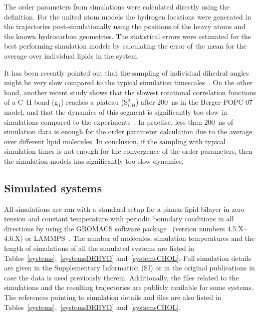 \documentclass[pre,aps,floatfix,authordate1-4,twocolumn]{revtex4-1}
\begin{document}
The order parameters from simulations were calculated directly using the definition.
For the united atom models the hydrogen locations were generated 
in the trajectories post-simulationally using the positions of the heavy atoms and the known hydrocarbon geometries.
The statistical errors were estimated for the best performing simulation
models by calculating the error of the mean for the average over individual lipids in the system. 

It has been recently pointed out that the sampling of individual dihedral angles might be very
slow compared to the typical simulation timescales~\cite{vogel12}. On the other hand, another recent
study shows that the slowest rotational correlation functions of a C--H bond (g$_1$) reaches a plateau (S$_{CH}^2$)
after 200~ns in the Berger-POPC-07~\cite{ollila07a} model, and that the dynamics of this segment is significantly too slow in simulations
compared to the experiments~\cite{ferreira15}. In practise, less than 200~ns of simulation data is enough for the order parameter
calculation due to the average over different lipid molecules. In conclusion, if the sampling with typical simulation times
is not enough for the convergence of the order parameters, then the simulation models has significantly too slow dynamics.





\subsection{Simulated systems}
All simulations are ran with a standard setup for a planar lipid bilayer in zero tension and constant temperature
with periodic boundary conditions in all directions by using the GROMACS software package~\cite{hess08} 
(version numbers 4.5.X--4.6.X) or LAMMPS~\cite{plimpton95}.
The number of molecules, simulation temperatures and the length of simulations of all the simulated systems 
are listed in Tables~\ref{systems},~\ref{systemsDEHYD} and~\ref{systemsCHOL}. Full simulation
details are given in the Supplementary Information (SI) or in the original publications in case the
data is used previously therein. Additionally, the files related to the simulations and the resulting trajectories are publicly
available for some systems. The references pointing to simulation details and files are also listed in Tables~\ref{systems},~\ref{systemsDEHYD} and~\ref{systemsCHOL}.
\end{document}
